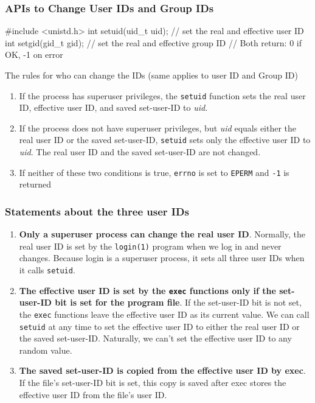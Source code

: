 \documentclass[newPxFont,sthlmFooter,nooffset]{beamer}
\begin{document}
\begin{frame}[containsverbatim,t]
  \frametitle{APIs to Change User IDs and Group IDs}

\begin{codedef}
#include <unistd.h>
int setuid(uid_t uid);  // set the real and effective user ID
int setgid(gid_t gid);  // set the real and effective group ID
// Both return: 0 if OK, -1 on error
\end{codedef}

The rules for who can change the IDs (same applies to user ID and Group ID)
\begin{enumerate}
\item If the process has superuser privileges, the \texttt{setuid}
  function sets the real user ID, effective user ID, and saved
  set-user-ID to \textit{uid}.
\item If the process does not have superuser privileges, but
  \textit{uid} equals either the real user ID or the saved
  set-user-ID, \texttt{setuid} sets only the effective user ID to
  \textit{uid}. The real user ID and the saved set-user-ID are not
  changed.
\item If neither of these two conditions is true, \texttt{errno} is
  set to \texttt{EPERM} and \texttt{-1} is returned
\end{enumerate}

\end{frame}

\begin{frame}[t]
  \frametitle{Statements about the three user IDs}
  \begin{enumerate}
  \item \textbf{Only a superuser process can change the real user
    ID}. Normally, the real user ID is set by the \texttt{login(1)}
    program when we log in and never changes. Because login is a
    superuser process, it sets all three user IDs when it calls
    \texttt{setuid}.
  \item \textbf{The effective user ID is set by the \texttt{exec}
      functions only if the set-user-ID bit is set for the program
      file}. If the set-user-ID bit is not set, the \texttt{exec}
    functions leave the effective user ID as its current value. We can
    call \texttt{setuid} at any time to set the effective user ID to
    either the real user ID or the saved set-user-ID. Naturally, we
    can’t set the effective user ID to any random value.
  \item \textbf{The saved set-user-ID is copied from the effective
      user ID by exec}. If the file’s set-user-ID bit is set, this
    copy is saved after exec stores the effective user ID from the
    file’s user ID.
  \end{enumerate}
\end{frame}
\end{document}

